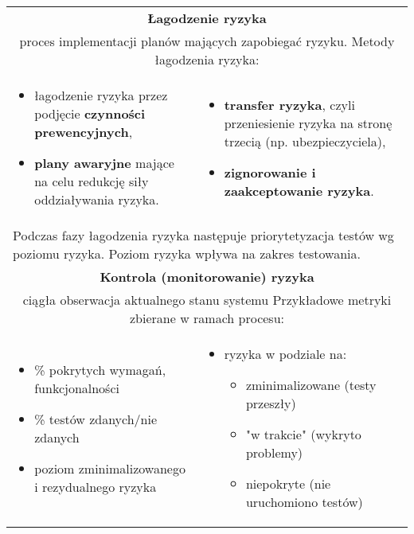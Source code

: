 \documentclass[../main.tex]{subfiles}
\begin{document}
\begin{table}[H]
\begin{center}
\begin{tabular}{| p{8cm}  p{8cm} |}
                \hline
                \hline
                \multicolumn{2}{|c|}{\textbf{Łagodzenie ryzyka}}\\
                \multicolumn{2}{|c|}{proces implementacji planów mających zapobiegać ryzyku. Metody łagodzenia ryzyka:}\\
                \hline
                \begin{itemize}
                    \item łagodzenie ryzyka przez podjęcie \textbf{czynności prewencyjnych},
                    \item \textbf{plany awaryjne} mające na celu redukcję siły oddziaływania ryzyka.
                \end{itemize}
                &
                \begin{itemize}
                    \item \textbf{transfer ryzyka}, czyli przeniesienie ryzyka na stronę trzecią (np. ubezpieczyciela),
                    \item \textbf{zignorowanie i zaakceptowanie ryzyka}.
                \end{itemize}\\
                \multicolumn{2}{|p{16cm}|}{Podczas fazy łagodzenia ryzyka następuje priorytetyzacja testów wg poziomu ryzyka. Poziom ryzyka wpływa na zakres testowania.}\\
                \hline
                \hline
                \multicolumn{2}{|c|}{\textbf{Kontrola (monitorowanie) ryzyka}}\\
                \multicolumn{2}{|c|}{ciągła obserwacja aktualnego stanu systemu Przykładowe metryki zbierane w ramach procesu:}\\
                \hline
                \begin{itemize}
                    \item \% pokrytych wymagań, funkcjonalności
                    \item \% testów zdanych/nie zdanych
                    \item poziom zminimalizowanego i rezydualnego ryzyka
                \end{itemize}
                &
                \begin{itemize}
                    \item ryzyka w podziale na:
                    \begin{itemize}
                        \item zminimalizowane (testy przeszły)
                        \item "w trakcie" (wykryto problemy)
                        \item niepokryte (nie uruchomiono testów)
                    \end{itemize}
                \end{itemize}\\
                \hline
            \end{tabular}
        \end{center}
    \end{table}
\end{document}
